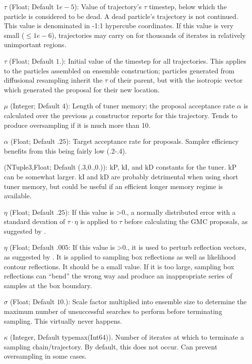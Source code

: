 $\tau$ (Float; Default $1e-5$): Value of trajectory's $\tau$ timestep, below which the particle is considered to be dead. A dead particle's trajectory is not continued. This value is denominated in -1:1 hypercube coordinates. If this value is very small ($\leq 1e-6$), trajectories may carry on for thousands of iterates in relatively unimportant regions.

$\tau$ (Float; Default $1.$): Initial value of the timestep for all trajectories. This applies to the particles assembled on ensemble construction; particles generated from diffusional resampling inherit the $\tau$ of their parent, but with the isotropic vector which generated the proposal for their new location.

$\mu$ (Integer; Default $4$): Length of tuner memory; the proposal acceptance rate $\alpha$ is calculated over the previous $\mu$ constructor reports for this trajectory. Tends to produce oversampling if it is much more than 10.

$\alpha$ (Float; Default $.25$): Target acceptance rate for proposals. Sampler efficiency benefits from this being fairly low (.2-.4).

 (NTuple{3,Float}; Default ($.3$,$0.$,$0.$)): kP, kI, and kD constants for the tuner. kP can be somewhat larger. kI and kD are probably detrimental when using short tuner memory, but could be useful if an efficient longer memory regime is available.

$\eta$ (Float; Default $.25$): If this value is >0., a normally distributed error with a standard devation of $\tau \cdot $$\eta$ is applied to $\tau$ before calculating the GMC proposals, as suggested by \cite{Skilling2012}.

$\eta$ (Float; Default $.005$: If this value is >0., it is used to perturb reflection vectors, as suggested by \cite{Skilling2012}. It is applied to sampling box reflections as well as likelihood contour reflections. It should be a small value. If it is too large, sampling box reflections can ``bend'' the wrong way and produce an inappropriate series of samples at the box boundary.

$\sigma$ (Float; Default $10.$): Scale factor multiplied into ensemble size to determine the maximum number of unsuccessful searches to perform before terminating sampling. This virtually never happens.

$\kappa$ (Integer, Default typemax(Int64)). Number of iterates at which to terminate a sampling chain/trajectory. By default, this does not occur. Can prevent oversampling in some cases.


